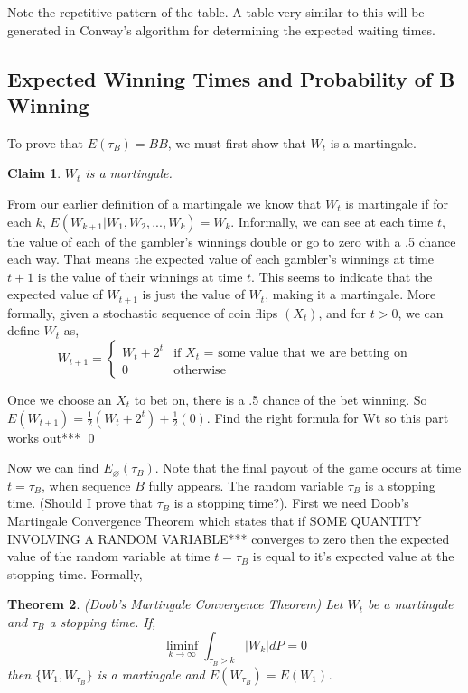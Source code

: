 \documentclass{article}
\newtheorem{theorem}{Theorem}[section]
\newtheorem{claim}[theorem]{Claim}
\numberwithin{mytheorem}{subsection} %
\begin{document}
			Note the repetitive pattern of the table. A table very similar to this will be generated in Conway's algorithm for determining the expected waiting times. 

		\subsection{Expected Winning Times and Probability of B Winning}
		    To prove that $E(\tau_B) = BB$, we must first show that $W_t$ is a martingale.

			\begin{claim}
				$W_t$ is a martingale.
			\end{claim}

			\begin{PROOF}
				From our earlier definition of a martingale we know that $W_t$ is martingale if for each $k$, $E(W_{k+1} | W_1,W_2,...,W_k) = W_k$. Informally, we can see at each time $t$, the value of each of the gambler's winnings double or go to zero with a .5 chance each way. That means the expected value of each gambler's winnings at time $t+1$ is the value of their winnings at time $t$. This seems to indicate that the expected value of $W_{t+1}$ is just the value of $W_t$, making it a martingale. More formally, given a stochastic sequence of coin flips $(X_t)$, and for $t > 0$, we can define $W_t$ as, 
			    \[ W_{t+1}=\begin{cases} 
			      W_{t} + 2^t & \text{if $X_t$ = some value that we are betting on}\\
			      0 & \text{otherwise} 
				  \end{cases} \]

				 Once we choose an $X_t$ to bet on, there is a .5 chance of the bet winning. So $E(W_{t+1}) = \frac{1}{2}(W_t + 2^t) + \frac{1}{2}(0)$. Find the right formula for Wt so this part works out*** \qed
			\end{PROOF}

			Now we can find $E_{\varnothing}(\tau_{B})$. Note that the final payout of the game occurs at time $t=\tau_{B}$, when sequence $B$ fully appears. The random variable $\tau_B$ is a stopping time. (Should I prove that $\tau_{B}$ is a stopping time?). First we need Doob's Martingale Convergence Theorem which states that if SOME QUANTITY INVOLVING A RANDOM VARIABLE*** converges to zero then the expected value of the random variable at time $t=\tau_B$ is equal to it's expected value at the stopping time. Formally,

			\begin{theorem}(Doob's Martingale Convergence Theorem)
				Let $W_t$ be a martingale and $\tau_B$ a stopping time. If,
				$$\liminf\limits_{k\rightarrow \infty} \int_{\tau_B > k} |W_k|dP = 0$$
				then $\{W_1, W_{\tau_B}\}$ is a martingale and $E(W_{\tau_B}) = E(W_1)$.
			\end{theorem}
\end{document}

